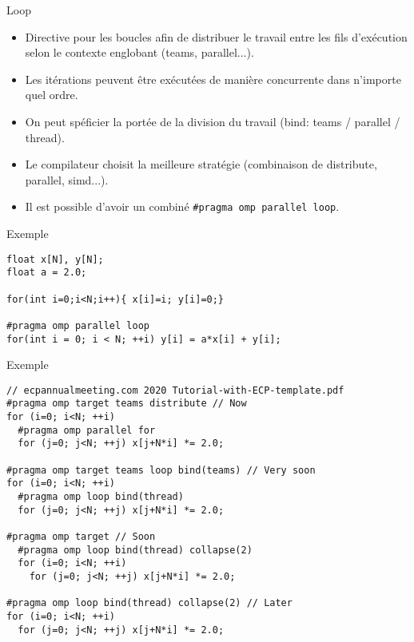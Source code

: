 \documentclass[10pt]{beamer}
\begin{document}
\begin{frame}[fragile]{Loop}

  \begin{itemize}
    \item Directive pour les boucles afin de distribuer le travail entre les fils d'exécution selon le contexte englobant (teams, parallel...).
    
    \item Les itérations peuvent être exécutées de manière concurrente dans n'importe quel ordre.

    \item On peut spéficier la portée de la division du travail (bind: teams / parallel / thread).

    \item Le compilateur choisit la meilleure stratégie (combinaison de distribute, parallel, simd...).

    \item Il est possible d'avoir un combiné \verb|#pragma omp parallel loop|.
    
  \end{itemize}
\end{frame}

\begin{frame}[fragile]{Exemple}

  \small
  \begin{verbatim}
float x[N], y[N];
float a = 2.0;

for(int i=0;i<N;i++){ x[i]=i; y[i]=0;}

#pragma omp parallel loop
for(int i = 0; i < N; ++i) y[i] = a*x[i] + y[i];
  \end{verbatim}
\end{frame}

\begin{frame}[fragile]{Exemple}

  \scriptsize
  \begin{verbatim}
// ecpannualmeeting.com 2020 Tutorial-with-ECP-template.pdf
#pragma omp target teams distribute // Now
for (i=0; i<N; ++i)
  #pragma omp parallel for
  for (j=0; j<N; ++j) x[j+N*i] *= 2.0;

#pragma omp target teams loop bind(teams) // Very soon
for (i=0; i<N; ++i)
  #pragma omp loop bind(thread)
  for (j=0; j<N; ++j) x[j+N*i] *= 2.0;

#pragma omp target // Soon
  #pragma omp loop bind(thread) collapse(2)
  for (i=0; i<N; ++i)
    for (j=0; j<N; ++j) x[j+N*i] *= 2.0;
    
#pragma omp loop bind(thread) collapse(2) // Later
for (i=0; i<N; ++i)
  for (j=0; j<N; ++j) x[j+N*i] *= 2.0;
  \end{verbatim}
\end{frame}
\end{document}
